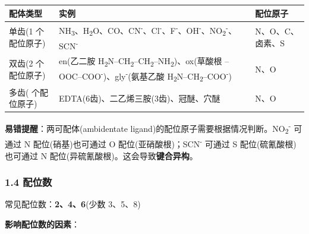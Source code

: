 {\def\LTcaptype{none} %
\begin{longtable}[]{@{}
  >{\raggedright\arraybackslash}p{}
  >{\raggedright\arraybackslash}p{}
  >{\centering\arraybackslash}p{}@{}}
\toprule\noalign{}
\begin{minipage}[b]{\linewidth}\raggedright
配体类型
\end{minipage} & \begin{minipage}[b]{\linewidth}\raggedright
实例
\end{minipage} & \begin{minipage}[b]{\linewidth}\centering
配位原子
\end{minipage} \\
\midrule\noalign{}
\endhead
\bottomrule\noalign{}
\endlastfoot
单齿(1 个配位原子) & NH\textsubscript{3}、H\textsubscript{2}O、CO、CN\textsuperscript{-}、Cl\textsuperscript{-}、F\textsuperscript{-}、OH\textsuperscript{-}、NO\textsubscript{2}\textsuperscript{-}、SCN\textsuperscript{-} & N、O、C、卤素、S \\
双齿(2 个配位原子) & en(乙二胺 H\textsubscript{2}N--CH\textsubscript{2}--CH\textsubscript{2}--NH\textsubscript{2})、ox(草酸根 --OOC--COO\textsuperscript{-})、gly\textsuperscript{-}(氨基乙酸 H\textsubscript{2}N--CH\textsubscript{2}--COO\textsuperscript{-}) & N、O \\
多齿(3 个配位原子) & EDTA(6齿)、二乙烯三胺(3齿)、冠醚、穴醚 & N、O \\
\end{longtable}
}

\textbf{易错提醒}：两可配体(ambidentate ligand)的配位原子需要根据情况判断。NO\textsubscript{2}\textsuperscript{-} 可通过 N 配位(硝基)也可通过 O 配位(亚硝酸根)；SCN\textsuperscript{-} 可通过 S 配位(硫氰酸根)也可通过 N 配位(异硫氰酸根)。这会导致\textbf{键合异构}。

\subsubsection{1.4 配位数}\label{ux914dux4f4dux6570}

常见配位数：\textbf{2、4、6}(少数 3、5、8)

\textbf{影响配位数的因素}：

